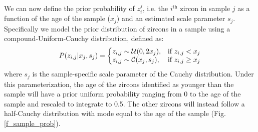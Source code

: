 \documentclass[12pt,letterpaper]{article}
\begin{document}
We can now define the prior probability of $z_i^j$, i.e. the $i^{\text{th}}$ zircon in sample $j$ as a function of the age of the sample ($x_j$) and an estimated scale parameter $s_j$. 
Specifically we model the prior distribution of zircons in a sample using a compound-Uniform-Cauchy distribution, defined as:
\begin{equation}
P(z_{i,j} | x_j, s_j) = \left\{
\begin{array}{@{}ll@{}}
    z_{i,j} \sim \mathcal{U}(0, 2x_j), & \text{if}\      z_{i,j} < x_j \\
    z_{i,j} \sim \mathcal{C}(x_j, s_j), & \text{if}\      z_{i,j} \geq x_j \\
\end{array}\right.
\end{equation}
where $s_j$ is the sample-specific scale parameter of the Cauchy distribution. 
Under this parameterization, the age of the zircons identified as younger than the sample will have a prior uniform probability ranging from 0 to the age of the sample and rescaled to integrate to 0.5.
The other zircons will instead follow a half-Cauchy distribution with mode equal to the age of the sample (Fig. \ref{f_sample_prob}). 
\end{document}

